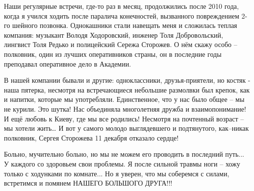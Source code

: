 Наши регулярные встречи, где-то раз в месяц, продолжились после 2010 года,
когда я учился ходить после паралича конечностей, вызванного повреждением 2-го
шейного позвонка. Однокашники стали навещать меня и сложилась теплая компания:
музыкант Володя Ходоровский, инженер Толя Добровольский, лингвист Толя Редько и
полицейский Сережа Сторожев. О нём скажу особо – полковник, один из лучших
оперативников страны, он в последние годы преподавал оперативное дело в
Академии.

В нашей компании бывали и другие: одноклассники, друзья-приятели, но костяк -
наша пятерка, несмотря на встречающиеся небольшие размолвки был крепок, как и
напитки, которые мы употребляли. Единственное, что у нас было общее – мы не
курили. Это шутка! Нас объединяла многолетняя дружба и взаимопонимание! И ещё
любовь к Киеву, где мы все родились! Несмотря на почтенный возраст – мы хотели
жить… И вот у самого молодо выглядевшего и подтянутого, как–никак полковник,
Сергея Сторожева 11 декабря отказало сердце!

Больно, мучительно больно, но мы не можем его проводить в последний путь... У
каждого со здоровьем свои проблемы. Я после сильной травмы ноги – хожу только с
ходунками по комнате... Но я уверен, что мы соберемся с силами, встретимся и
помянем НАШЕГО БОЛЬШОГО ДРУГА!!!

